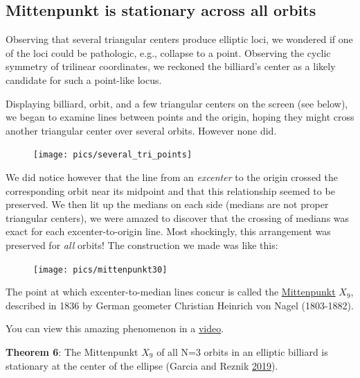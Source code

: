 \documentclass[]{article}
\begin{document}
\hypertarget{mittenpunkt-is-stationary-across-all-orbits}{%
\subsection{Mittenpunkt is stationary across all orbits}\label{mittenpunkt-is-stationary-across-all-orbits}}

Observing that several triangular centers produce elliptic loci, we wondered if one of the loci could be pathologic, e.g., collapse to a point. Observing the cyclic symmetry of trilinear coordinates, we reckoned the billiard's center as a likely candidate for such a point-like locus.

Displaying billiard, orbit, and a few triangular centers on the screen (see below), we began to examine lines between points and the origin, hoping they might cross another triangular center over several orbits. However none did.

\begin{figure}[H]

{\centering \texttt{[image: pics/several\_tri\_points]} 

}

\end{figure}

We did notice however that the line from an \emph{excenter} to the origin crossed the corresponding orbit near its midpoint and that this relationship seemed to be preserved. We then lit up the medians on each side (medians are not proper triangular centers), we were amazed to discover that the crossing of medians was exact for each excenter-to-origin line. Most shockingly, this arrangement was preserved for \emph{all} orbits! The construction we made was like this:

\begin{figure}[H]

{\centering \texttt{[image: pics/mittenpunkt30]} 

}

\end{figure}

The point at which excenter-to-median lines concur is called the \href{https://en.wikipedia.org/wiki/Mittenpunkt}{Mittenpunkt} \(X_{9}\), described in 1836 by German geometer Christian Heinrich von Nagel (1803-1882).

You can view this amazing phenomenon in a \href{https://youtu.be/AoCWcza95OA}{video}.

\textbf{Theorem 6}: The Mittenpunkt \(X_{9}\) of all N=3 orbits in an elliptic billiard is stationary at the center of the ellipse (Garcia and Reznik \protect\hyperlink{ref-garcia19a}{2019}).
\end{document}
